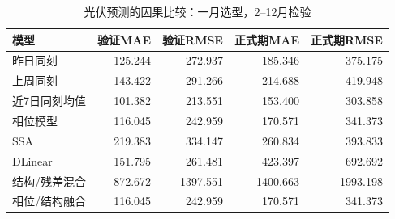\begin{table}[H]
\centering\small
\caption{光伏预测的因果比较：一月选型，2--12月检验}\label{tab:q2-forecast-comparison}
\setlength{\tabcolsep}{4pt}
\begin{tabular}{lrrrr}
\toprule
模型 & 验证MAE & 验证RMSE & 正式期MAE & 正式期RMSE \\
\midrule
昨日同刻 & 125.244 & 272.937 & 185.346 & 375.175 \\
上周同刻 & 143.422 & 291.266 & 214.688 & 419.948 \\
近7日同刻均值 & 101.382 & 213.551 & 153.400 & 303.858 \\
相位模型 & 116.045 & 242.959 & 170.571 & 341.373 \\
SSA & 219.383 & 334.147 & 260.834 & 393.833 \\
DLinear & 151.795 & 261.481 & 423.397 & 692.692 \\
结构/残差混合 & 872.672 & 1397.551 & 1400.663 & 1993.198 \\
相位/结构融合 & 116.045 & 242.959 & 170.571 & 341.373 \\
\bottomrule
\end{tabular}
\end{table}

